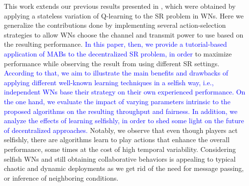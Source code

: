 \documentclass[10pt,journal,compsoc]{IEEEtran}
\newcommand{\francesc}[1]{\textcolor{blue}{#1}}
\begin{document}
	This work extends our previous results presented in \cite{wilhelmi2017implications}, which were obtained by applying a stateless variation of Q-learning to the SR problem in WNs. Here we generalize the contributions done by implementing several action-selection strategies to allow WNs choose the channel and transmit power to use based on the resulting performance. \francesc{In this paper, then, we provide a tutorial-based application of MABs to the decentralized SR problem, in order} to maximize performance while observing the result from using different SR settings. \francesc{According to that, we aim to illustrate the main benefits and drawbacks of applying different well-known learning techniques in a selfish way, i.e., independent WNs base their strategy on their own experienced performance. On the one hand, we evaluate the impact of varying parameters intrinsic to the proposed algorithms on the resulting throughput and fairness. In addition, we analyze the effects of learning selfishly, in order to shed some light on the future of decentralized approaches.} 	Notably, we observe that even though players act selfishly, there are algorithms %
	learn to play actions that enhance the overall performance, some times at the cost of high temporal variability. Considering selfish WNs and still obtaining collaborative behaviors is appealing to typical chaotic and dynamic deployments as we get rid of the need for message passing, or inference of neighboring conditions.
		
	
\end{document}
